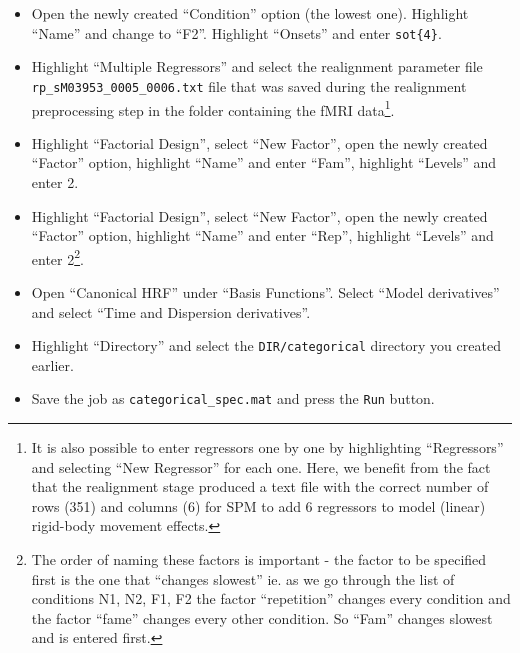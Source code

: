 \begin{itemize}
\item Open the newly created ``Condition'' option (the lowest one). Highlight ``Name'' and change to ``F2''. Highlight ``Onsets'' and enter \texttt{sot\{4\}}.
\item Highlight ``Multiple Regressors'' and select the realignment parameter file \texttt{rp\_sM03953\_0005\_0006.txt} file that was saved during the realignment preprocessing step in the folder containing the fMRI data\footnote{It is also possible to enter regressors one by one by highlighting ``Regressors'' and selecting ``New Regressor'' for each one. Here, we benefit from the fact that the realignment stage produced a text file with the correct number of rows (351) and columns (6) for SPM to add 6 regressors to model (linear) rigid-body movement effects.}.
\item Highlight ``Factorial Design'', select ``New Factor'', open the newly created ``Factor'' option, highlight ``Name'' and enter ``Fam'', highlight ``Levels'' and enter 2.
\item Highlight ``Factorial Design'', select ``New Factor'', open the newly created ``Factor'' option, highlight ``Name'' and enter ``Rep'', highlight ``Levels'' and enter 2\footnote{The order of naming these factors is important - the factor to be specified first is the one that ``changes slowest'' ie. as we go through the list of conditions N1, N2, F1, F2 the factor ``repetition'' changes every condition and the factor ``fame'' changes every other condition. So ``Fam'' changes slowest and is entered first.}.
\item Open ``Canonical HRF'' under ``Basis Functions''. Select ``Model derivatives'' and select ``Time and Dispersion derivatives''.
\item Highlight ``Directory'' and select the \texttt{DIR/categorical} directory you created earlier.
\item Save the job as \texttt{categorical\_spec.mat} and press the \texttt{Run} button.
\end{itemize}

